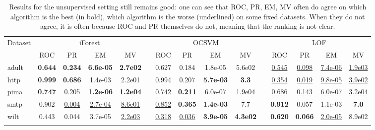 \begin{table}[!ht]
\centering
\caption{Results for the unsupervised setting still remains good: one can see that ROC, PR, EM, MV often do agree on which algorithm is the best (in bold), which algorithm is the worse (underlined) on some fixed datasets. When they do not agree, it is often because ROC and PR themselves do not, meaning that the ranking is not clear.}
\label{evaluation:table:results-unsupervised}
\footnotesize
\tabcolsep=0.11cm
\resizebox{\linewidth}{!} {
\begin{tabular}{l cccc c cccc c cccc}
\toprule
Dataset      & \multicolumn{4}{c}{iForest} & & \multicolumn{4}{c}{OCSVM} & & \multicolumn{4}{c}{LOF} \\ %
  \cmidrule{1-15}
~            & ROC  & PR   & EM    &  MV  &  & ROC   & PR    & EM    & MV    &    & ROC  & PR   & EM    & MV    \\
adult        &\bf 0.644 &\bf 0.234 &\bf 6.6e-05&\bf 2.7e02 & &0.627  &0.184  &1.8e-05&5.6e02   &  &\underline{0.545} &\underline{0.098} &\underline{7.4e-06}&\underline{1.9e03} \\
http         &\bf 0.999 &\bf 0.686 &1.4e-03&2.2e01&  &0.994  &0.207  &\bf 5.7e-03&\bf 3.3    &    &\underline{0.354} &\underline{0.019} &\underline{9.8e-05}&\underline{3.9e02} \\
pima         &\bf 0.747 &0.205 &\bf 1.2e-06&\bf 1.2e04 & &0.742  &\bf 0.211  &6.0e-07&1.9e04  &   &\underline{0.686} &\underline{0.143} &\underline{6.0e-07}&\underline{3.2e04} \\
smtp         &0.902 &\underline{0.004} &\underline{2.7e-04}&\underline{8.6e01}&  &\underline{0.852}  &\bf 0.365  &\bf 1.4e-03&7.7   &     &\bf 0.912 &0.057 &1.1e-03&\bf 7.0    \\ %
wilt         &0.443 &0.044 &3.7e-05&\underline{2.2e03} & &\underline{0.318}  &\underline{0.036}  &\bf 3.9e-05&\bf 4.3e02 &    &\bf 0.620 &\bf 0.066 &\underline{2.0e-05}&8.9e02 \\  &&&&&&&&&&&&&& \\


\end{tabular}}
\end{table}
